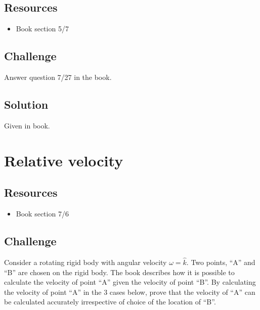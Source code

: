 \subsection*{Resources}
\begin{itemize}
    \item Book section 5/7
\end{itemize}

\subsection*{Challenge}
Answer question 7/27 in the book.

\subsection*{Solution}
Given in book.




%
%




\newpage
\section{Relative velocity}

\subsection*{Resources}
\begin{itemize}
    \item Book section 7/6
\end{itemize}

\subsection*{Challenge}
Consider a rotating rigid body with angular velocity $\omega=\hat{k}$. Two points, ``A'' and ``B'' are chosen on the rigid body. The book describes how it is possible to calculate the velocity of point ``A'' given the velocity of point ``B''. By calculating the velocity of point ``A'' in the 3 cases below, prove that the velocity of ``A'' can be calculated accurately irrespective of choice of the location of ``B''.


